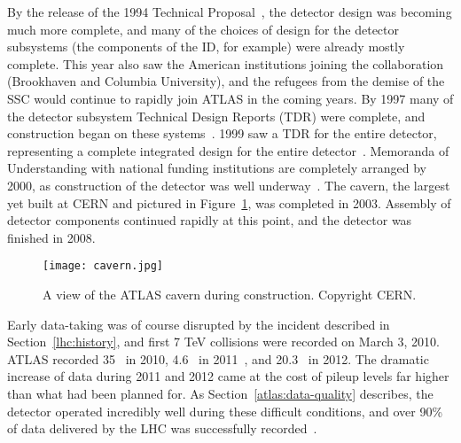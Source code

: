 By the release of the 1994 Technical Proposal~\cite{ATLASTP}, the detector design was becoming much more complete, and many of the choices of design for the detector subsystems (the components of the ID, for example) were already mostly complete. This year also saw the American institutions joining the collaboration (Brookhaven and Columbia University), and the refugees from the demise of the SSC would continue to rapidly join ATLAS in the coming years. By 1997 many of the detector subsystem Technical Design Reports (TDR) were complete, and construction began on these systems~\cite{ATLASHistory}. 1999 saw a TDR for the entire detector, representing a complete integrated design for the entire detector~\cite{tdr1,tdr2}. Memoranda of Understanding with national funding institutions are completely arranged by 2000, as construction of the detector was well underway~\cite{ATLASHistory}. The cavern, the largest yet built at CERN and pictured in Figure~\ref{fig:detector:cavern}, was completed in 2003. Assembly of detector components continued rapidly at this point, and the detector was finished in 2008.


\begin{figure}
\centering
\texttt{[image: cavern.jpg]}
\caption{A view of the ATLAS cavern during construction. Copyright CERN.}
\label{fig:detector:cavern}
\end{figure}


Early data-taking was of course disrupted by the incident described in Section~\ref{lhc:history}, and first 7 TeV collisions were recorded on March 3, 2010. ATLAS recorded 35 \ipb~in 2010, 4.6 \ifb~in 2011~\cite{ATLASLumi}, and 20.3 \ifb~in 2012. The dramatic increase of data during 2011 and 2012 came at the cost of pileup levels far higher than what had been planned for. As Section~\ref{atlas:data-quality} describes, the detector operated incredibly well during these difficult conditions, and over 90\% of data delivered by the LHC was successfully recorded~\cite{ATLASDQ}.











